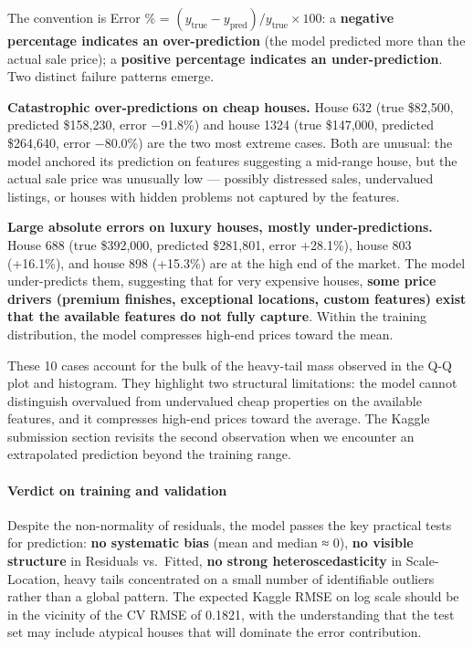 The convention is Error \% =
\((y_{\text{true}} - y_{\text{pred}})/y_{\text{true}} \times 100\): a
\textbf{negative percentage indicates an over-prediction} (the model
predicted more than the actual sale price); a \textbf{positive
percentage indicates an under-prediction}. Two distinct failure patterns
emerge.

\textbf{Catastrophic over-predictions on cheap houses.} House 632 (true
\$82,500, predicted \$158,230, error −91.8\%) and house 1324 (true
\$147,000, predicted \$264,640, error −80.0\%) are the two most extreme
cases. Both are unusual: the model anchored its prediction on features
suggesting a mid-range house, but the actual sale price was unusually
low --- possibly distressed sales, undervalued listings, or houses with
hidden problems not captured by the features.

\textbf{Large absolute errors on luxury houses, mostly
under-predictions.} House 688 (true \$392,000, predicted \$281,801,
error +28.1\%), house 803 (+16.1\%), and house 898 (+15.3\%) are at the
high end of the market. The model under-predicts them, suggesting that
for very expensive houses, \textbf{some price drivers (premium finishes,
exceptional locations, custom features) exist that the available
features do not fully capture}. Within the training distribution, the
model compresses high-end prices toward the mean.

These 10 cases account for the bulk of the heavy-tail mass observed in
the Q-Q plot and histogram. They highlight two structural limitations:
the model cannot distinguish overvalued from undervalued cheap
properties on the available features, and it compresses high-end prices
toward the average. The Kaggle submission section revisits the second
observation when we encounter an extrapolated prediction beyond the
training range.

\paragraph{Verdict on training and
validation}\label{verdict-on-training-and-validation}

Despite the non-normality of residuals, the model passes the key
practical tests for prediction: \textbf{no systematic bias} (mean and
median ≈ 0), \textbf{no visible structure} in Residuals vs.~Fitted,
\textbf{no strong heteroscedasticity} in Scale-Location, heavy tails
concentrated on a small number of identifiable outliers rather than a
global pattern. The expected Kaggle RMSE on log scale should be in the
vicinity of the CV RMSE of 0.1821, with the understanding that the test
set may include atypical houses that will dominate the error
contribution.

